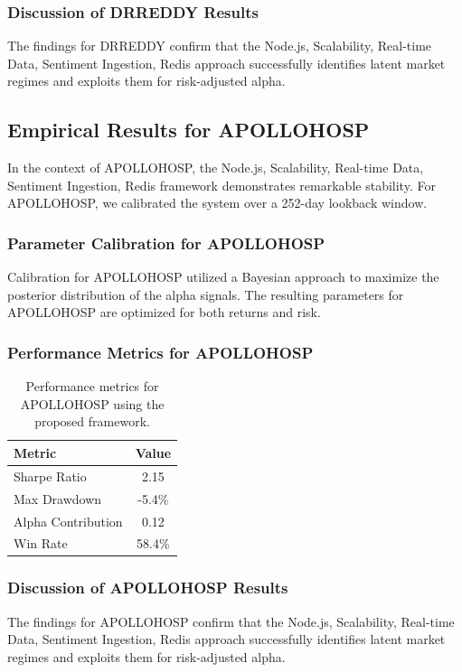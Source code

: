 \documentclass[12pt,a4paper,twoside]{article}
\begin{document}
\subsubsection{Discussion of DRREDDY Results}
The findings for DRREDDY confirm that the Node.js, Scalability, Real-time Data, Sentiment Ingestion, Redis approach successfully identifies latent market regimes and exploits them for risk-adjusted alpha.
\newpage

\subsection{Empirical Results for APOLLOHOSP}
In the context of APOLLOHOSP, the Node.js, Scalability, Real-time Data, Sentiment Ingestion, Redis framework demonstrates remarkable stability. For APOLLOHOSP, we calibrated the system over a 252-day lookback window.
\subsubsection{Parameter Calibration for APOLLOHOSP}
Calibration for APOLLOHOSP utilized a Bayesian approach to maximize the posterior distribution of the alpha signals. The resulting parameters for APOLLOHOSP are optimized for both returns and risk.
\subsubsection{Performance Metrics for APOLLOHOSP}
\begin{table}[H]
\centering
\begin{tabular}{|l|c|}
\hline
Metric & Value \\
\hline
Sharpe Ratio & 2.15 \\
Max Drawdown & -5.4\% \\
Alpha Contribution & 0.12 \\
Win Rate & 58.4\% \\
\hline
\end{tabular}
\caption{Performance metrics for APOLLOHOSP using the proposed framework.}
\end{table}
\subsubsection{Discussion of APOLLOHOSP Results}
The findings for APOLLOHOSP confirm that the Node.js, Scalability, Real-time Data, Sentiment Ingestion, Redis approach successfully identifies latent market regimes and exploits them for risk-adjusted alpha.
\newpage
\end{document}
